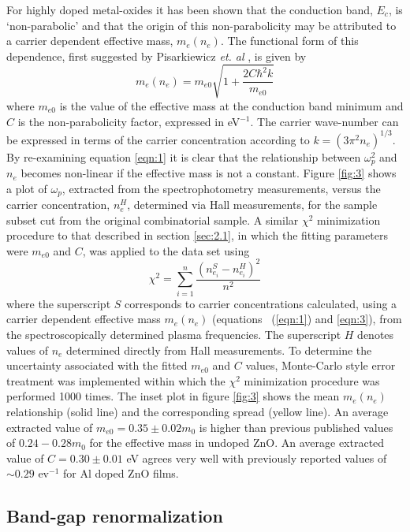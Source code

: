 \documentclass[aps,prl,preprint,showpacs,showkeys, linenumbers]{revtex4-1}
\begin{document}
For highly doped metal-oxides it has been shown that the conduction band, $E_c$, is `non-parabolic' and that the origin of this non-parabolicity may be attributed to a carrier dependent effective mass, $m_e(n_e)$. The functional form of this dependence, first suggested by Pisarkiewicz \textit{et. al} \cite{Pisarkiewicz1990}, is given by
\begin{equation}
\label{eqn:3}
m_e(n_e) = m_{e0}\sqrt{1+\frac{2C\hbar^2k}{m_{e0}}}
\end{equation}
where $m_{e0}$ is the value of the effective mass at the conduction band minimum and $C$ is the non-parabolicity factor, expressed in eV$^{-1}$. The carrier wave-number can be expressed in terms of the carrier concentration according to $k = (3\pi^2n_e)^{1/3}$. By re-examining equation \ref{eqn:1} it is clear that the relationship between $\omega_p^2$ and $n_e$ becomes non-linear if the effective mass is not a constant. Figure \ref{fig:3} shows a plot of $\omega_{p}$, extracted from the spectrophotometry measurements, versus the carrier concentration, $n_e^H$, determined via Hall measurements, for the sample subset cut from the original combinatorial sample. A similar $\chi^2$ minimization procedure to that described in section \ref{sec:2.1}, in which the fitting parameters were $m_{e0}$ and $C$, was applied to the data set using
\begin{equation}\label{eqn:4}
\chi^2 = \sum_{i=1}^n\frac{(n_{e_i}^S-n_{e_i}^H)^2}{n^2}
\end{equation}
where the superscript $S$ corresponds to carrier concentrations calculated, using a carrier dependent effective mass $m_e(n_e)$ (equations ~(\ref{eqn:1}) and \ref{eqn:3}), from the spectroscopically determined plasma frequencies. The superscript $H$ denotes values of $n_e$ determined directly from Hall measurements. To determine the uncertainty associated with the fitted $m_{e0}$ and $C$ values, Monte-Carlo style error treatment \cite{Mendelsberg2009} was implemented within which the $\chi^2$ minimization procedure was performed 1000 times. The inset plot in figure \ref{fig:3} shows the mean $m_e(n_e)$ relationship (solid line) and the corresponding spread (yellow line). An average extracted value of $m_{e0} = 0.35\pm0.02m_0$ is higher than previous published values of $0.24 - 0.28 m_0$ for the effective mass in undoped ZnO. An average extracted value of $C=0.30\pm0.01$ eV agrees very well with previously reported values of $\sim0.29$ ev$^{-1}$ \cite{Ruske2009, Ellmer2001} for Al doped ZnO films.

\subsection{ Band-gap renormalization}
\label{sec:2.3}
\end{document}
